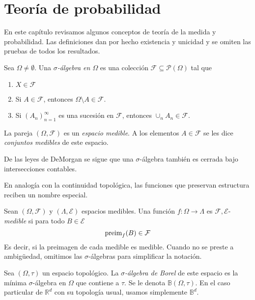 \documentclass[main.tex]{subfiles}
\begin{document}
\chapter{Teoría de probabilidad}
En este capítulo revisamos algunos conceptos de teoría de la medida y probabilidad. Las definiciones dan por hecho existencia y unicidad y se omiten las pruebas de todos los resultados. 

\begin{definition}
Sea $\Omega\neq\emptyset$. Una \textit{$\sigma$-álgebra en $\Omega$} es una colección $\mathcal{F}\subseteq\mathcal{P}(\Omega)$ tal que
\begin{enumerate}[label=\roman*.]
	\item $X \in \mathcal{F}$
	\item Si $A\in\mathcal{F}$, entonces $\Omega\setminus A \in \mathcal{F}$.
	\item Si $(A_n)_{n=1}^\infty$ es una sucesión en $\mathcal{F}$, entonces $\cup_nA_n\in \mathcal{F}$.
\end{enumerate}
La pareja $(\Omega, \mathcal{F})$ es un \textit{espacio medible}. A los elementos $A\in\mathcal{F}$ se les dice \textit{conjuntos medibles} de este espacio.
\end{definition}

De las leyes de DeMorgan se sigue que una $\sigma$-álgebra también es cerrada bajo intersecciones contables. 

En analogía con la continuidad topológica, las funciones que preservan estructura reciben un nombre especial.

\begin{definition}
Sean $(\Omega, \mathcal{F})$ y $(\Lambda, \mathcal{E})$ espacios medibles. Una función $f: \Omega \to \Lambda$ es $\mathcal{F,E}$-\textit{medible} si para todo $B\in\mathcal{E}$
\begin{equation*}
\operatorname{preim}_f(B)\in\mathcal{F}	
\end{equation*}
Es decir, si la preimagen de cada medible es medible. Cuando no se preste a ambigüedad, omitimos las $\sigma$-álgebras para simplificar la notación.
\end{definition}

\begin{definition}
Sea $(\Omega, \tau)$ un espacio topológico. La $\sigma$\textit{-álgebra de Borel} de este espacio es la mínima $\sigma$-álgebra en $\Omega$ que contiene a $\tau$. Se le denota $\mathbb{B}(\Omega, \tau)$.
En el caso particular de $\mathbb{R}^d$ con su topología usual, usamos simplemente $\mathbb{B}^d$.
\end{definition}
\end{document}

